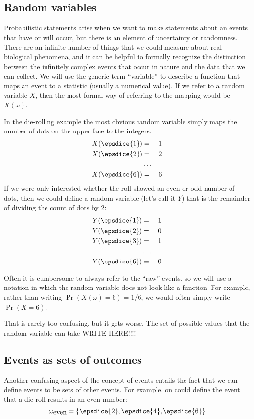 \documentclass[11pt]{article}
\begin{document}
\subsection*{Random variables}
Probabilistic statements arise when we want to make statements about an events that have or will occur, but there is an element of uncertainty or randomness.
There are an infinite number of things that we could measure about real biological phenomena, and it can be helpful to formally recognize the distinction between the infinitely complex events that occur in nature and the data that we can collect.
We will use the generic term ``variable'' to describe a function that maps an event to a statistic (usually a numerical value).
If we refer to a random variable $X$, then the most formal way of referring to the mapping would be $X(\omega)$.

In the die-rolling example the most obvious random variable simply maps the number of dots on the upper face to the integers:
\begin{eqnarray*}
	X(\epsdice{1})&  = & 1\\
	X(\epsdice{2})&  = & 2\\
	& \ldots & \\
	X(\epsdice{6})&  = & 6\\
\end{eqnarray*}
If we were only interested whether the roll showed an even or odd number of dots, then we could define a random variable (let's call it $Y$) that is the remainder of dividing the count of dots by 2:
\begin{eqnarray*}
	Y(\epsdice{1})&  = & 1\\
	Y(\epsdice{2})&  = & 0\\
	Y(\epsdice{3})&  = & 1\\
	& \ldots & \\
	Y(\epsdice{6})&  = & 0\\
\end{eqnarray*}

Often it is cumbersome to always refer to the ``raw'' events, so we will use a notation in which the random variable does not look like a function.
For example, rather than writing $\Pr(X(\omega) = 6) = 1/6$, we would often simply write $\Pr(X = 6)$.

That is rarely too confusing, but it gets worse.
The set of possible values that the random variable can take WRITE HERE!!!!

\subsection*{Events as sets of outcomes}
Another confusing aspect of the concept of events entails the fact that we can define events to be sets of other events.  For example, on could define the event that a die roll results in an even number:
$$\omega_{\mbox{even}} = \{\epsdice{2}, \epsdice{4}, \epsdice{6}\}$$




 
\end{document}
